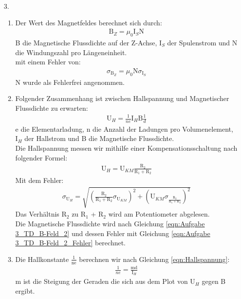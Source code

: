 \documentclass[12pt]{scrartcl}
\begin{document}
\begin{enumerate}
\item[3.]
\begin{enumerate}
\item
Der Wert des Magnetfeldes berechnet sich durch:
\begin{align}
 \text{B}_Z = \mu_0 \text{I}_S \text{N}
 \label{eqn:Aufgabe 3_TD_B-Feld_2}
\end{align}
B die Magnetische Flussdichte auf der Z-Achse, I$_S$ der Spulenstrom und N die Windungszahl pro Längeneinheit.\\
mit einem Fehler von:
\begin{align}
\sigma_{\text{B}_Z} = \mu_0 \text{N} \sigma_{\text{I}_S}
\label{eqn:Aufgabe 3_TD_B-Feld_2_Fehler}
\end{align}
N wurde als Fehlerfrei angenommen.\\
\item
Folgender Zusammenhang ist zwischen Hallspannung und Magnetischer Flussdichte zu erwarten:
\begin{align}
\text{U}_H = \frac{1}{ne} \text{I}_H \text{B} \frac{1}{d}
\label{eqn:Hallspannung}
\end{align}
e die Elementarladung, n die Anzahl der Ladungen pro Volumenelement, I$_H$ der Hallstrom und B die Magnetische Flussdichte.\\
Die Hallspannung messen wir mithilfe einer Kompensationsschaltung nach folgender Formel:
\begin{align}
\text{U}_H = \text{U}_{KM} \frac{\text{R}_2}{\text{R}_1+\text{R}_2}
\label{eqn:U_H}
\end{align}
Mit dem Fehler:
\begin{align}
\sigma_{\text{U}_H} = \sqrt{
\left(\frac{\text{R}_2}{\text{R}_1+\text{R}_2}\sigma_{\text{U}_{KM}}\right)^2+
\left(\text{U}_{KM}\sigma_{\frac{\text{R}_2}{\text{R}_1+\text{R}_2}}\right)^2}
\label{eqn:U_H_Fehler}
\end{align}
Das Verhältnis R$_2$ zu R$_1$ + R$_2$ wird am Potentiometer abgelesen.\\
Die Magnetische Flussdichte wird nach Gleichung \ref{eqn:Aufgabe 3_TD_B-Feld_2} und dessen Fehler mit Gleichung \ref{eqn:Aufgabe 3_TD_B-Feld_2_Fehler} berechnet.
\item
Die Hallkonstante $\frac{1}{\text{ne}}$ berechnen wir nach Gleichung \ref{eqn:Hallspannung}:
\begin{align}
\frac{1}{ne} = \frac{\text{m} \text{d}}
{\text{I}_H}
\label{eqn:hallkonstante}
\end{align}
m ist die Steigung der Geraden die sich aus dem Plot von U$_H$ gegen B ergibt.\\

\end{enumerate}
\end{enumerate}
\end{document}
